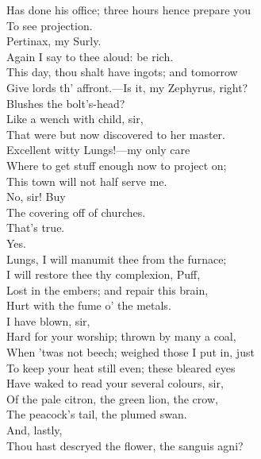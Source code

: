 \documentclass[a4paper,oneside,12pt]{memoir}
\begin{document}
\begin{drama*}
Has done his office; three hours hence prepare you\\
To see projection.\\
\mammonspeaks {} Pertinax, my Surly.\\
Again I say to thee aloud: be rich.\\
This day, thou shalt have ingots; and tomorrow\\
Give lords th' affront.---Is it, my Zephyrus, right?\\
Blushes the bolt's-head?\\
\facespeaks {} Like a wench with child, sir,\\
That were but now discovered to her master.\\
\mammonspeaks Excellent witty Lungs!---my only care\\
Where to get stuff enough now to project on;\\
This town will not half serve me.\\
\facespeaks {} No, sir! Buy\\
The covering off of churches.\\
\mammonspeaks {} That's true.\\
\facespeaks {} Yes.\\
\mammonspeaks Lungs, I will manumit thee from the furnace;\\
I will restore thee thy complexion, Puff,\\
Lost in the embers; and repair this brain,\\
Hurt with the fume o' the metals.\\
\facespeaks {} I have blown, sir,\\
Hard for your worship; thrown by many a coal,\\
When 'twas not beech; weighed those I put in, just\\
To keep your heat still even; these bleared eyes\\
Have waked to read your several colours, sir,\\
Of the pale citron, the green lion, the crow,\\
The peacock's tail, the plumed swan.\\
\mammonspeaks {} And, lastly,\\
Thou hast descryed the flower, the sanguis agni?\\

\end{drama*}
\end{document}
